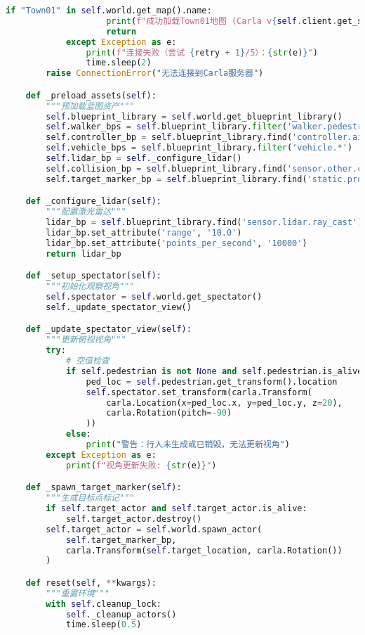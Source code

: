 \begin{lstlisting}[language=Python]
                if "Town01" in self.world.get_map().name:
                    print(f"成功加载Town01地图 (Carla v{self.client.get_server_version()})")
                    return
            except Exception as e:
                print(f"连接失败（尝试 {retry + 1}/5）：{str(e)}")
                time.sleep(2)
        raise ConnectionError("无法连接到Carla服务器")

    def _preload_assets(self):
        """预加载蓝图资产"""
        self.blueprint_library = self.world.get_blueprint_library()
        self.walker_bps = self.blueprint_library.filter('walker.pedestrian.*')
        self.controller_bp = self.blueprint_library.find('controller.ai.walker')
        self.vehicle_bps = self.blueprint_library.filter('vehicle.*')
        self.lidar_bp = self._configure_lidar()
        self.collision_bp = self.blueprint_library.find('sensor.other.collision')
        self.target_marker_bp = self.blueprint_library.find('static.prop.streetbarrier')

    def _configure_lidar(self):
        """配置激光雷达"""
        lidar_bp = self.blueprint_library.find('sensor.lidar.ray_cast')
        lidar_bp.set_attribute('range', '10.0')
        lidar_bp.set_attribute('points_per_second', '10000')
        return lidar_bp

    def _setup_spectator(self):
        """初始化观察视角"""
        self.spectator = self.world.get_spectator()
        self._update_spectator_view()

    def _update_spectator_view(self):
        """更新俯视视角"""
        try:
            # 空值检查
            if self.pedestrian is not None and self.pedestrian.is_alive:
                ped_loc = self.pedestrian.get_transform().location
                self.spectator.set_transform(carla.Transform(
                    carla.Location(x=ped_loc.x, y=ped_loc.y, z=20),
                    carla.Rotation(pitch=-90)
                ))
            else:
                print("警告：行人未生成或已销毁，无法更新视角")
        except Exception as e:
            print(f"视角更新失败: {str(e)}")

    def _spawn_target_marker(self):
        """生成目标点标记"""
        if self.target_actor and self.target_actor.is_alive:
            self.target_actor.destroy()
        self.target_actor = self.world.spawn_actor(
            self.target_marker_bp,
            carla.Transform(self.target_location, carla.Rotation())
        )

    def reset(self, **kwargs):
        """重置环境"""
        with self.cleanup_lock:
            self._cleanup_actors()
            time.sleep(0.5)


\end{lstlisting}
